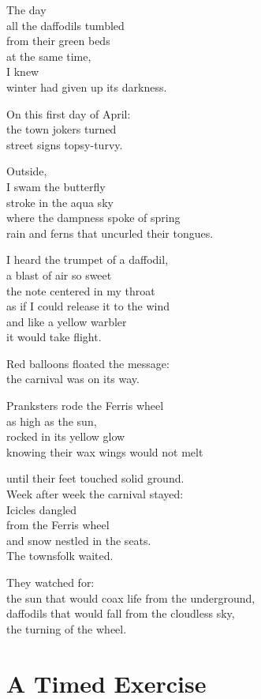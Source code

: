 \documentclass[twoside,10pt]{book}
\begin{document}
The day\\
all the daffodils tumbled\\
from their green beds\\
at the same time,\\
I knew\\
winter had given up its darkness.

On this first day of April:\\
the town jokers turned\\
street signs topsy-turvy.

Outside,\\
I swam the butterfly\\
stroke in the aqua sky\\
where the dampness spoke of spring\\
rain and ferns that uncurled their tongues.

I heard the trumpet of a daffodil,\\
a blast of air so sweet\\
the note centered in my throat\\
as if I could release it to the wind\\
and like a yellow warbler\\
it would take flight.

Red balloons floated the message:\\
the carnival was on its way.

Pranksters rode the Ferris wheel\\
as high as the sun,\\
rocked in its yellow glow\\
knowing their wax wings would not melt

until their feet touched solid ground.\\
Week after week the carnival stayed:\\
Icicles dangled\\
from the Ferris wheel\\
and snow nestled in the seats.\\
The townsfolk waited.

They watched for:\\
the sun that would coax life from the underground,\\
daffodils that would fall from the cloudless sky,\\
the turning of the wheel.


\clearpage
\section{A Timed Exercise}
\end{document}
